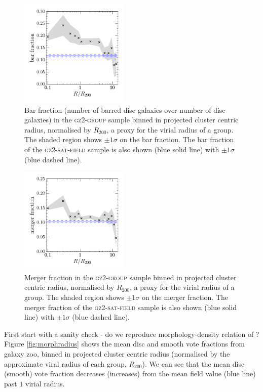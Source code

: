 \documentclass[useAMS,usenatbib]{mn2e}
\begin{document}
\begin{figure}
\includegraphics[width=0.46\textwidth]{bar_fraction_over_disc_trend_with_log_radius_sat_matched_field_cand.pdf}
\caption{Bar fraction (number of barred disc galaxies over number of disc galaxies) in the \textsc{gz2-group} sample binned in projected cluster centric radius, normalised by $R_{200}$, a proxy for the virial radius of a group. The shaded region shows $\pm1\sigma$ on the bar fraction. The bar fraction of the \textsc{gz2-sat-field} sample is also shown (blue solid line) with $\pm1\sigma$ (blue dashed line).}
\label{fig:barradius}
\end{figure}

\begin{figure}
\includegraphics[width=0.46\textwidth]{merger_fraction_trend_with_log_radius_compare_sat_field_cand.pdf}
\caption{Merger fraction in the \textsc{gz2-group} sample binned in projected cluster centric radius, normalised by $R_{200}$, a proxy for the virial radius of a group. The shaded region shows $\pm1\sigma$ on the merger fraction. The merger fraction of the \textsc{gz2-sat-field} sample is also shown (blue solid line) with $\pm1\sigma$ (blue dashed line).}
\label{fig:mergerradius}
\end{figure}

First start with a sanity check - do we reproduce morphology-density relation of \citealt{dressler80}? Figure \ref{fig:morphradius} shows the mean disc and smooth vote fractions from galaxy zoo, binned in projected cluster centric radius (normalised by the approximate viral radius of each group, $R_{200}$). We can see that the mean disc (smooth) vote fraction decreases (increases) from the mean field value (blue line) past $1$ virial radius.
\end{document}
